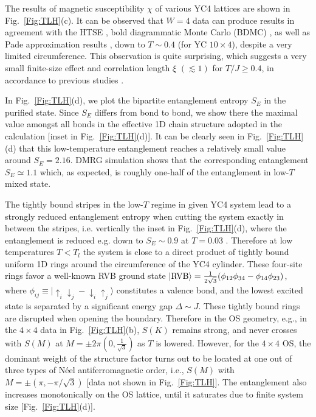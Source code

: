 \documentclass[aps,prx,twocolumn,showpacs,psfig,superscriptaddress,longbibliography]{revtex4-1}
\newcommand{\Fig}[1]{Fig.~\ref{#1}}
\begin{document}
 {The results of magnetic susceptibility $\chi$ of various YC4 lattices are shown in Fig.~\ref{Fig:TLH}(c). It can be observed that $W=4$ data can produce results in agreement with the HTSE \cite{Elstner-1993}, bold diagrammatic Monte Carlo (BDMC) \cite{Kulagin2013}, as well as Pade approximation results \cite{Zheng-2005}, down to $T\sim 0.4$ (for YC $10\times4$), despite a very limited circumference. This observation is quite surprising, which suggests a very small finite-size effect and correlation length $\xi$ $(\lesssim 1)$ for $T/J \geq 0.4$, in accordance to previous studies \cite{Elstner-1993}. }

 {In Fig.~\ref{Fig:TLH}(d), we plot the bipartite entanglement entropy $S_E$ in the purified state. Since $S_E$ differs from bond to bond, we show there the maximal value amongst all bonds in the effective
1D chain structure adopted in the calculation [inset in Fig.~\ref{Fig:TLH}(d)]. It can be clearly seen in Fig.~\ref{Fig:TLH}(d) that this low-temperature entanglement reaches a relatively small value around $S_E=2.16$. DMRG simulation shows that the corresponding entanglement $S_E \simeq 1.1$ which, as expected, is roughly one-half of the entanglement in low-$T$ mixed state.
}

 {The tightly bound stripes in the low-$T$ regime in given
YC4 system lead to a strongly reduced entanglement entropy
when cutting the system exactly in between the stripes,
i.e. vertically the inset in \Fig{Fig:TLH}(d), where
the entanglement is reduced e.g. down to $S_E\sim 0.9$ at $T=0.03$
}.
%
 {Therefore at low temperatures $T<T_l$ 
the system is close to a direct product of tightly bound uniform 1D rings
around the circumference of the YC4 cylinder.
These four-site rings favor a well-known RVB ground state $| \rm{RVB} \rangle = \frac{1}{2\sqrt{3}}(\phi_{1 2} \phi_{3 4}  - \phi_{1 4} \phi_{2 3})$,
where $\phi_{i j} \equiv \vert \uparrow_i \downarrow_j - \downarrow_i \uparrow_j \rangle$ constitutes a valence bond, and the lowest excited state is separated by a significant energy gap $\Delta \sim J$.
}
%
 {These tightly bound rings are disrupted when opening
the boundary. Therefore in the OS geometry,
e.g., in the $4\times4$ data in \Fig{Fig:TLH}(b),
$S(K)$ remains strong, and never crosses with $S(M)$
at  $M=\pm 2\pi (0, \frac{1}{\sqrt{3}})$ as $T$ is lowered.
%
However, for the $4\times4$ OS, the dominant weight of the structure
factor turns out to be located at one out of three types of 
N\'eel antiferromagnetic order,
i.e., $S(M)$ with $M= \pm(\pi, -\pi/\sqrt{3})$ [data not shown in \Fig{Fig:TLH}]. The entanglement also increases  {monotonically} on the OS lattice, until it saturates due to finite system size [Fig.~\ref{Fig:TLH}(d)]}.
\end{document}
